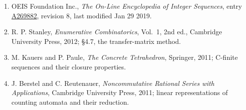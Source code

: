 \documentclass[11pt]{article}
\theoremstyle{definition}
\begin{document}
\begin{enumerate}

\item OEIS Foundation Inc., \emph{The On-Line Encyclopedia of Integer Sequences}, entry \href{https://oeis.org/A269882}{A269882}, revision 8, last modified Jan 29 2019.

\item R. P. Stanley, \emph{Enumerative Combinatorics}, Vol.~1, 2nd ed., Cambridge University Press, 2012; \S4.7, the transfer-matrix method.

\item M. Kauers and P. Paule, \emph{The Concrete Tetrahedron}, Springer, 2011; C-finite sequences and their closure properties.

\item J. Berstel and C. Reutenauer, \emph{Noncommutative Rational Series with Applications}, Cambridge University Press, 2011; linear representations of counting automata and their reduction.

\end{enumerate}
\end{document}
